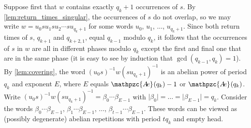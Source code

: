 \documentclass[a4paper,fleqn]{article}
\providecommand{\abs}[1]{\lvert#1\rvert}
\newcommand{\abexp}[2][]{\mathpzc{A\mkern-3mu e}_{#1}(#2)}
\begin{document}
  Suppose first that $w$ contains exactly $q_k + 1$ occurrences of $s$. By \autoref{lem:return_times_singular}, the
  occurrences of $s$ do not overlap, so we may write $w = u_0 s u_1 s u_2 \dotsm s u_{q_k + 1}$ for some words $u_0$,
  $u_1$, $\ldots$, $u_{q_k + 1}$. Since both return times of $s$, $q_{k+1}$ and $q_{k+2,1}$, equal $q_{k-1}$ modulo
  $q_k$, it follows that the occurrences of $s$ in $w$ are all in different phases modulo $q_k$ except the first and
  final one that are in the same phase (it is easy to see by induction that $\gcd(q_{k-1}, q_k) = 1$). By
  \autoref{lem:covering}, the word $(u_0 s)^{-1} w (s u_{q_k + 1})^{-1}$ is an abelian power of period $q_k$ and
  exponent $E$, where $E$ equals $\abexp{q_k} - 1$ or $\abexp{q_k}$. Write
  $(u_0 s)^{-1} w (s u_{q_k + 1})^{-1} = \beta_0 \dotsm \beta_{E-1}$ with
  $\abs{\beta_0} = \ldots = \abs{\beta_{E-1}} = q_k$. Consider the words $\beta_0 \dotsm \beta_{E-1}$,
  $\beta_1 \dotsm \beta_{E-1}$, $\ldots$, $\beta_{t-1} \dotsm \beta_{E-1}$. These words can be viewed as (possibly
  degenerate) abelian repetitions with period $tq_k$ and empty head.
\end{document}
